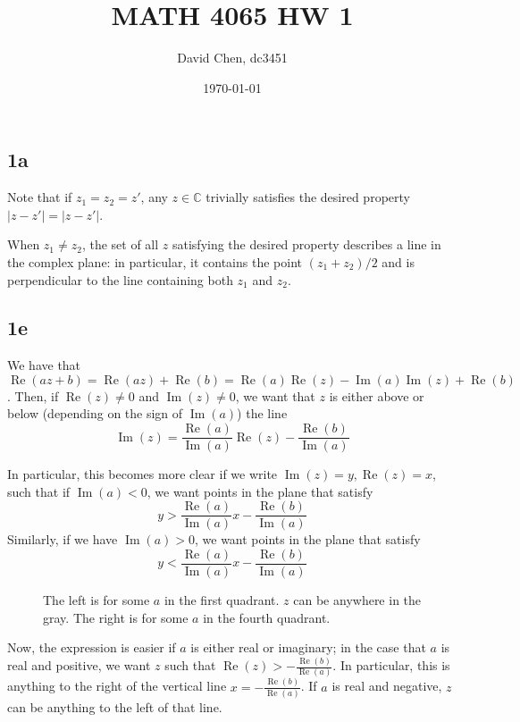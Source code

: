 \documentclass[12pt,letterpaper]{article}
\title{MATH 4065 HW 1}
\author{David Chen, dc3451}
\date{\today}
\theoremstyle{definition}
\newcommand{\C}{\mathbb{C}}
\DeclareMathOperator{\real}{Re}
\DeclareMathOperator{\imag}{Im}
\newcommand{\incfig}[1]{}
\begin{document}
\maketitle

\subsection*{1a}

Note that if $z_1 = z_2 = z'$, any $z \in \C$ trivially satisfies the desired property $|z
- z'| = |z - z'|$.

When $z_1 \neq z_2$, the set of all $z$ satisfying the desired property
describes a line in the complex plane: in particular, it contains the point $(z_1
+ z_2) / 2$ and is perpendicular to the line containing both $z_1$ and $z_2$.

\begin{figure}[H]
  \centering
  \incfig{perp}
\end{figure}

\subsection*{1e}

We have that $\real(az + b) = \real(az) + \real(b) = \real(a)\real(z) -
\imag(a)\imag(z) + \real(b)$. Then, if $\real(z) \neq 0$ and $\imag(z) \neq 0$,
we want that $z$ is either above or below (depending on the sign of $\imag(a)$) the line
\[
  \imag(z) = \frac{\real(a)}{\imag(a)}\real(z) - \frac{\real(b)}{\imag(a)}
\]

In particular, this becomes more clear if we write $\imag(z) = y, \real(z) = x$,
such that if $\imag(a) < 0$, we want points in the plane that satisfy
\[
  y > \frac{\real(a)}{\imag(a)}x - \frac{\real(b)}{\imag(a)}
\]
Similarly, if we have $\imag(a) > 0$, we want points in the plane that satisfy
\[
  y < \frac{\real(a)}{\imag(a)}x - \frac{\real(b)}{\imag(a)}
\]

\begin{figure}[H]
  \centering
  \incfig{parte}
  \caption{The left is for some $a$ in the first quadrant. $z$ can be anywhere
  in the gray. The right is for some $a$ in the fourth quadrant.}
\end{figure}

Now, the expression is easier if $a$ is either real or imaginary; in the case
that $a$ is real and positive, we want $z$ such that $\real(z) >
-\frac{\real(b)}{\real(a)}$. In particular, this is anything to the right of the
vertical line $x = -\frac{\real(b)}{\real(a)}$. If $a$ is real and negative, $z$ can be
anything to the left of that line.
\end{document}
